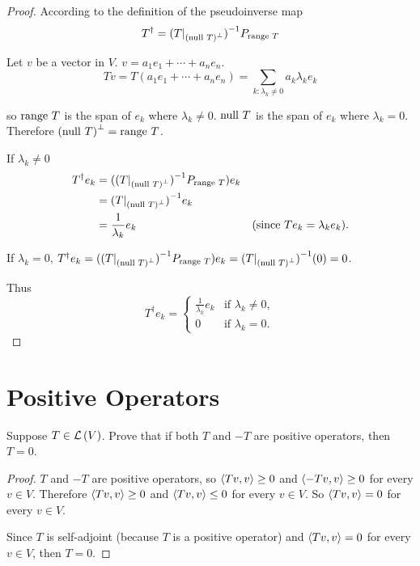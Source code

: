 \begin{proof}
    According to the definition of the pseudoinverse map
    \[
        T^{\dagger} = {(T\vert_{{(\operatorname{null}\,{T})}^{\bot}})}^{-1}P_{\operatorname{range}\,{T}}
    \]

    Let $v$ be a vector in $V$. $v = a_{1}e_{1} + \cdots + a_{n}e_{n}$.
    \[
        Tv = T(a_{1}e_{1} + \cdots + a_{n}e_{n}) = \sum_{k: \lambda_{k}\ne 0} a_{k}\lambda_{k}e_{k}
    \]

    so $\operatorname{range}\,{T}$ is the span of $e_{k}$ where $\lambda_{k}\ne 0$. $\operatorname{null}\,{T}$ is the span of $e_{k}$ where $\lambda_{k} = 0$. Therefore ${(\operatorname{null}\,{T})}^{\bot} = \operatorname{range}\,{T}$.

    If $\lambda_{k}\ne 0$
    \begin{align*}
        T^{\dagger}e_{k} & = ({(T\vert_{{(\operatorname{null}\,{T})}^{\bot}})}^{-1}P_{\operatorname{range}\,{T}})e_{k}                                               \\
                         & = {(T\vert_{{(\operatorname{null}\,{T})}^{\bot}})}^{-1}e_{k}                                                              \\
                         & = \frac{1}{\lambda_{k}}e_{k}                                 & \text{(since $Te_{k} = \lambda_{k}e_{k}$)}.
    \end{align*}

    If $\lambda_{k} = 0$, $T^{\dagger}e_{k} = ({(T\vert_{{(\operatorname{null}\,{T})}^{\bot}})}^{-1}P_{\operatorname{range}\,{T}})e_{k} = {(T\vert_{{(\operatorname{null}\,{T})}^{\bot}})}^{-1}(0) = 0$.

    Thus
    \[
        T^{\dagger}e_{k} = \begin{cases}
            \frac{1}{\lambda_{k}}e_{k} & \text{if $\lambda_{k}\ne 0$}, \\
            0                          & \text{if $\lambda_{k} = 0$}.
        \end{cases}
    \]
\end{proof}
\newpage

\section{Positive Operators}

\begin{exercise}
    Suppose $T \in \mathcal{L}\left({V}\right)$. Prove that if both $T$ and $-T$ are positive operators, then $T = 0$.
\end{exercise}

\begin{proof}
    $T$ and $-T$ are positive operators, so $\left\langle{Tv, v}\right\rangle\geq 0$ and $\left\langle{-Tv, v}\right\rangle\geq 0$ for every $v\in V$. Therefore $\left\langle{Tv, v}\right\rangle\geq 0$ and $\left\langle{Tv, v}\right\rangle\leq 0$ for every $v\in V$. So $\left\langle{Tv, v}\right\rangle = 0$ for every $v\in V$.

    Since $T$ is self-adjoint (because $T$ is a positive operator) and $\left\langle{Tv, v}\right\rangle = 0$ for every $v\in V$, then $T = 0$.
\end{proof}
\newpage

